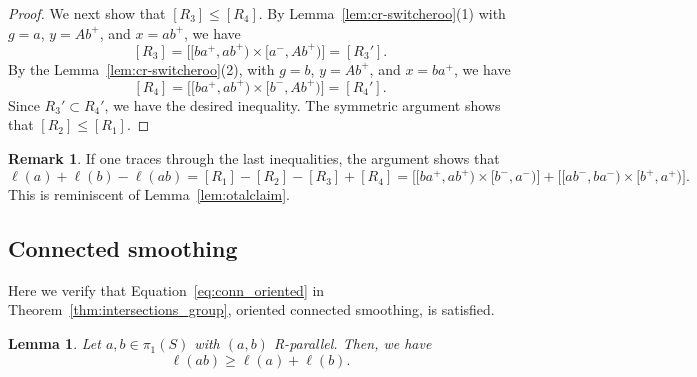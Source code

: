 \documentclass[11pt]{amsart}
\numberwithin{equation}{section}
\numberwithin{figure}{section}
\newtheorem{lemma}[theorem]{Lemma}
\theoremstyle{definition}
\newtheorem{remark}[theorem]{Remark}
\theoremstyle{plain}
\begin{document}
\begin{proof}
We next show that $[R_3] \le [R_4]$. By Lemma~\ref{lem:cr-switcheroo}(1)
with $g=a$, $y=Ab^+$, and $x=ab^+$, we have
\[
  [R_3] = \bigl[[ba^+,ab^+) \times [a^-,Ab^+)\bigr] = [R_3'].
\]
By the Lemma~\ref{lem:cr-switcheroo}(2), with $g=b$, $y=Ab^+$, and $x=ba^+$, we have
\[
  [R_4] = \bigl[[ba^+,ab^+) \times [b^-,Ab^+)\bigr] = [R_4'].
\]
Since $R_3' \subset R_4'$, we have the desired inequality.
The symmetric argument shows that $[R_2] \le [R_1]$.
\end{proof}

\begin{remark}
  If one traces through the last inequalities, the argument shows that
  \[
    \ell(a) + \ell(b) - \ell(ab) = [R_1] - [R_2] - [R_3] + [R_4]
    = \bigl[[ba^+, ab^+) \times [b^-,a^-)\bigr]
      + \bigl[[ab^-,ba^-) \times [b^+,a^+)\bigr].
  \]
  This is reminiscent of Lemma~\ref{lem:otalclaim}.
\end{remark}

\subsection{Connected smoothing}

Here we verify that Equation~\eqref{eq:conn_oriented} in Theorem~\ref{thm:intersections_group}, oriented connected smoothing, is satisfied.

\begin{lemma}\label{lem:crossratio_connected_smoothing}
Let $a,b \in \pi_1(S)$ with $(a,b)$ R-parallel.
Then, we have
\[
\ell(ab) \geq \ell(a) + \ell(b).
\]
\end{lemma}
\end{document}
